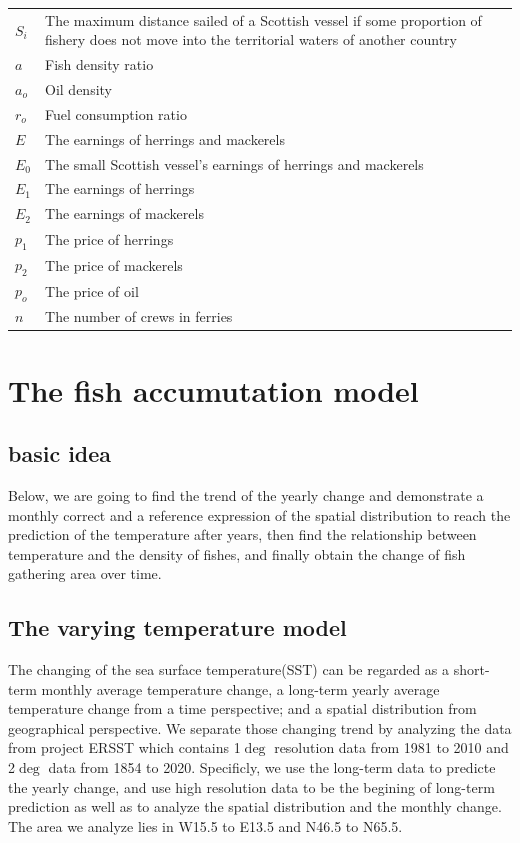 \documentclass{mcmthesis}
\begin{document}
\begin{center}
\begin{longtable}{p{}p{}m{}}
$S_i$      & The maximum distance sailed of a Scottish vessel   if  some proportion of fishery does not move  into the territorial waters of another country \\
$a$      & Fish density ratio \\
$a_o$      & Oil density \\
$r_o$      & Fuel consumption ratio \\
$E$      & The earnings  of herrings and mackerels \\
$E_0$      & The small Scottish vessel's earnings  of herrings and mackerels \\
$E_1$      & The earnings  of herrings\\
$E_2$      & The earnings  of mackerels\\
$p_1$      & The price  of herrings \\
$p_2$      & The price  of mackerels  \\
$p_o$      & The price  of oil  \\
$n$      & The number  of  crews in ferries \\



 \end{longtable}
 \end{center}

 \section{The fish accumutation model}
 \subsection{basic idea}
    Below, we are going to find the trend of the yearly change and demonstrate a monthly correct and a reference expression of the spatial distribution to reach the prediction of the temperature after years, then find the relationship between temperature and the density of fishes, and finally obtain the change of fish gathering area over time. 
 \subsection{The varying temperature model}
 
  
    The changing of the sea surface temperature(SST) can be regarded as a short-term monthly average temperature change, a long-term yearly average temperature change from a time perspective; and a spatial distribution from geographical perspective. 
    We separate those changing trend by analyzing the data from project ERSST which contains 1$\deg$ resolution data from 1981 to 2010 and 2$\deg$ data from 1854 to 2020. Specificly, we use the long-term data to predicte the yearly change, and use high resolution data to be the begining of long-term prediction as well as to analyze the spatial distribution and the monthly change. The area we analyze lies in W15.5 to E13.5 and N46.5 to N65.5.
    
\end{document}
